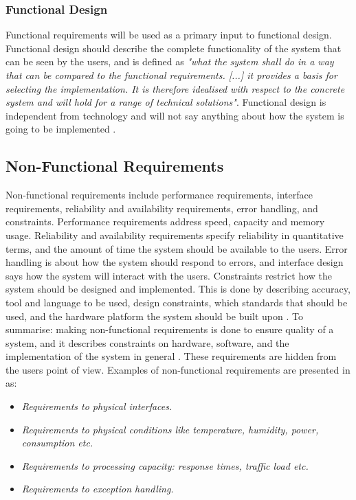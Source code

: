 \subsubsection{Functional Design}
Functional requirements will be used as a primary input to functional design. Functional design should describe the complete functionality of the system that can be seen by the users, and is defined as \emph{"what the system shall do in a way that can be compared to the functional requirements. [...] it provides a basis for selecting the implementation. It is therefore idealised with respect to the concrete system and will hold for a range of technical solutions"}. Functional design is independent from technology and will not say anything about how the system is going to be implemented \cite{systemutviklingDel1}. 

\subsection{Non-Functional Requirements}
Non-functional requirements include performance requirements, interface requirements, reliability and availability requirements, error handling, and constraints. Performance requirements address speed, capacity and memory usage. Reliability and availability requirements specify reliability in quantitative terms, and the amount of time the system should be available to the users. Error handling is about how the system should respond to errors, and interface design says how the system will interact with the users. Constraints restrict how the system should be designed and implemented. This is done by describing accuracy, tool and language to be used, design constraints, which standards that should be used, and the hardware platform the system should be built upon \cite{braude2000software}. To summarise: making non-functional requirements is done to ensure quality of a system, and it describes constraints on hardware, software, and the implementation of the system in general \cite{mmi}. These requirements are hidden from the users point of view. Examples of non-functional requirements are presented in \cite{systemutviklingDel1} as:
\begin{itemize}
\item \emph{Requirements to physical interfaces.}
\item \emph{Requirements to physical conditions like temperature, humidity, power, consumption etc.}
\item \emph{Requirements to processing capacity: response times, traffic load etc.}
\item \emph{Requirements to exception handling.} \\ \\ 
\end{itemize}   

